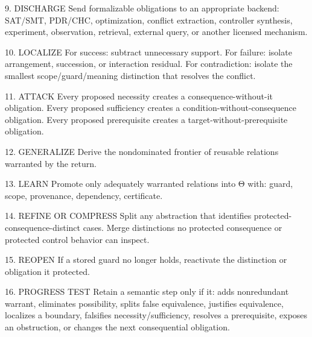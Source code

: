 \documentclass[
]{article}
\newenvironment{Shaded}{}{}
\newcommand{\NormalTok}[1]{#1}
\begin{document}
\begin{Shaded}
\begin{Highlighting}[]
\NormalTok{9. DISCHARGE}
\NormalTok{   Send formalizable obligations to an appropriate backend:}
\NormalTok{       SAT/SMT,}
\NormalTok{       PDR/CHC,}
\NormalTok{       optimization,}
\NormalTok{       conflict extraction,}
\NormalTok{       controller synthesis,}
\NormalTok{       experiment,}
\NormalTok{       observation,}
\NormalTok{       retrieval,}
\NormalTok{       external query,}
\NormalTok{       or another licensed mechanism.}

\NormalTok{10. LOCALIZE}
\NormalTok{    For success:}
\NormalTok{        subtract unnecessary support.}
\NormalTok{    For failure:}
\NormalTok{        isolate arrangement, succession, or interaction residual.}
\NormalTok{    For contradiction:}
\NormalTok{        isolate the smallest scope/guard/meaning distinction that}
\NormalTok{        resolves the conflict.}

\NormalTok{11. ATTACK}
\NormalTok{    Every proposed necessity creates a consequence{-}without{-}it obligation.}
\NormalTok{    Every proposed sufficiency creates a condition{-}without{-}consequence obligation.}
\NormalTok{    Every proposed prerequisite creates a target{-}without{-}prerequisite obligation.}

\NormalTok{12. GENERALIZE}
\NormalTok{    Derive the nondominated frontier of reusable relations warranted}
\NormalTok{    by the return.}

\NormalTok{13. LEARN}
\NormalTok{    Promote only adequately warranted relations into Θ with:}
\NormalTok{        guard,}
\NormalTok{        scope,}
\NormalTok{        provenance,}
\NormalTok{        dependency,}
\NormalTok{        certificate.}

\NormalTok{14. REFINE OR COMPRESS}
\NormalTok{    Split any abstraction that identifies protected{-}consequence{-}distinct}
\NormalTok{    cases.}
\NormalTok{    Merge distinctions no protected consequence or protected control}
\NormalTok{    behavior can inspect.}

\NormalTok{15. REOPEN}
\NormalTok{    If a stored guard no longer holds, reactivate the distinction or}
\NormalTok{    obligation it protected.}

\NormalTok{16. PROGRESS TEST}
\NormalTok{    Retain a semantic step only if it:}
\NormalTok{        adds nonredundant warrant,}
\NormalTok{        eliminates possibility,}
\NormalTok{        splits false equivalence,}
\NormalTok{        justifies equivalence,}
\NormalTok{        localizes a boundary,}
\NormalTok{        falsifies necessity/sufficiency,}
\NormalTok{        resolves a prerequisite,}
\NormalTok{        exposes an obstruction,}
\NormalTok{        or changes the next consequential obligation.}


\end{Highlighting}
\end{Shaded}
\end{document}
